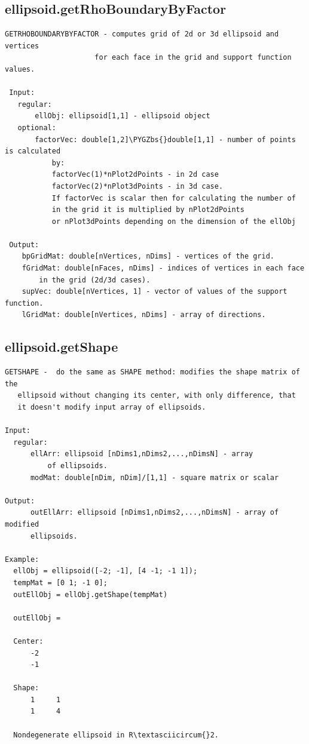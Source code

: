 \documentclass[letterpaper,10pt,english]{sphinxmanual}
\def\PYGZbs{\char`\\}
\begin{document}
\subsection{ellipsoid.getRhoBoundaryByFactor}
\label{chap_functions:ellipsoid-getrhoboundarybyfactor}
\begin{Verbatim}[commandchars=\\\{\}]
GETRHOBOUNDARYBYFACTOR - computes grid of 2d or 3d ellipsoid and vertices
                     for each face in the grid and support function values.

 Input:
   regular:
       ellObj: ellipsoid[1,1] - ellipsoid object
   optional:
       factorVec: double[1,2]\PYGZbs{}double[1,1] - number of points is calculated
           by:
           factorVec(1)*nPlot2dPoints - in 2d case
           factorVec(2)*nPlot3dPoints - in 3d case.
           If factorVec is scalar then for calculating the number of
           in the grid it is multiplied by nPlot2dPoints
           or nPlot3dPoints depending on the dimension of the ellObj

 Output:
    bpGridMat: double[nVertices, nDims] - vertices of the grid.
    fGridMat: double[nFaces, nDims] - indices of vertices in each face
        in the grid (2d/3d cases).
    supVec: double[nVertices, 1] - vector of values of the support function.
    lGridMat: double[nVertices, nDims] - array of directions.
\end{Verbatim}


\subsection{ellipsoid.getShape}
\label{chap_functions:ellipsoid-getshape}
\begin{Verbatim}[commandchars=\\\{\}]
GETSHAPE -  do the same as SHAPE method: modifies the shape matrix of the
   ellipsoid without changing its center, with only difference, that
   it doesn't modify input array of ellipsoids.

Input:
  regular:
      ellArr: ellipsoid [nDims1,nDims2,...,nDimsN] - array
          of ellipsoids.
      modMat: double[nDim, nDim]/[1,1] - square matrix or scalar

Output:
      outEllArr: ellipsoid [nDims1,nDims2,...,nDimsN] - array of modified
      ellipsoids.

Example:
  ellObj = ellipsoid([-2; -1], [4 -1; -1 1]);
  tempMat = [0 1; -1 0];
  outEllObj = ellObj.getShape(tempMat)

  outEllObj =

  Center:
      -2
      -1

  Shape:
      1     1
      1     4

  Nondegenerate ellipsoid in R\textasciicircum{}2.
\end{Verbatim}
\end{document}
